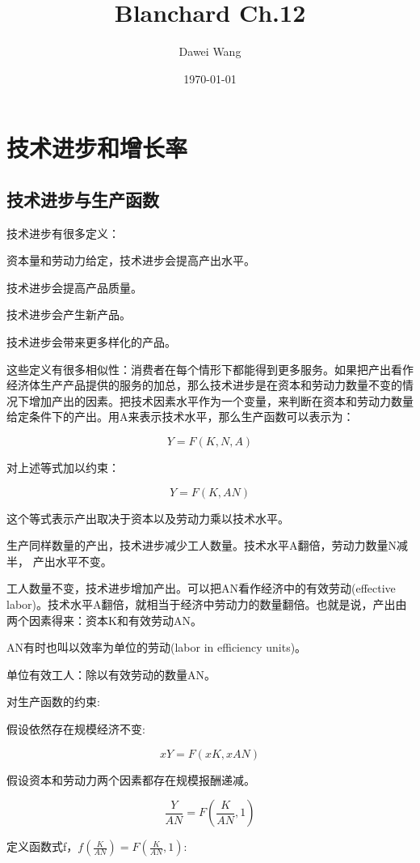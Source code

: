 \documentclass{article}
\title{Blanchard Ch.12}
\author{Dawei Wang}
\date{\today}
\begin{document}
	\maketitle	

\section{技术进步和增长率}

\subsection{技术进步与生产函数}

技术进步有很多定义：

资本量和劳动力给定，技术进步会提高产出水平。

技术进步会提高产品质量。

技术进步会产生新产品。

技术进步会带来更多样化的产品。

这些定义有很多相似性：消费者在每个情形下都能得到更多服务。如果把产出看作经济体生产产品提供的服务的加总，那么技术进步是在资本和劳动力数量不变的情况下增加产出的因素。把技术因素水平作为一个变量，来判断在资本和劳动力数量给定条件下的产出。用A来表示技术水平，那么生产函数可以表示为：

\[
Y=F(K,N,A)
\]

对上述等式加以约束：

\[
Y=F(K,AN)
\]

这个等式表示产出取决于资本以及劳动力乘以技术水平。

生产同样数量的产出，技术进步减少工人数量。技术水平A翻倍，劳动力数量N减半，
产出水平不变。

工人数量不变，技术进步增加产出。可以把AN看作经济中的有效劳动(effective labor)。技术水平A翻倍，就相当于经济中劳动力的数量翻倍。也就是说，产出由两个因素得来：资本K和有效劳动AN。

AN有时也叫以效率为单位的劳动(labor in efficiency units)。

单位有效工人：除以有效劳动的数量AN。

\hspace*{\fill}

对生产函数的约束:

假设依然存在规模经济不变:

\[
xY=F(xK,xAN)
\]

假设资本和劳动力两个因素都存在规模报酬递减。

\[
\frac{Y}{AN}=F(\frac{K}{AN},1)
\]

定义函数式f，$ f(\frac{K}{AN})=F(\frac{K}{AN},1) $:
\end{document}
